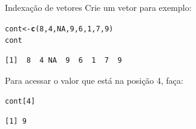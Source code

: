 \documentclass[10pt,handout]{beamer}\usepackage[]{graphicx}\usepackage[]{color}
\makeatletter
\newcommand{\hlnum}[1]{\textcolor[rgb]{0.686,0.059,0.569}{#1}}%
\newcommand{\hlstd}[1]{\textcolor[rgb]{0.345,0.345,0.345}{#1}}%
\newcommand{\hlkwb}[1]{\textcolor[rgb]{0.69,0.353,0.396}{#1}}%
\newcommand{\hlkwd}[1]{\textcolor[rgb]{0.737,0.353,0.396}{\textbf{#1}}}%
\newenvironment{kframe}{%
 \def\at@end@of@kframe{}%
 \ifinner\ifhmode%
  \def\at@end@of@kframe{\end{minipage}}%
  \begin{minipage}{\columnwidth}%
 \fi\fi%
 \def\FrameCommand##1{\hskip\@totalleftmargin \hskip-\fboxsep
 \colorbox{shadecolor}{##1}\hskip-\fboxsep
     \hskip-\linewidth \hskip-\@totalleftmargin \hskip\columnwidth}%
 \MakeFramed {\advance\hsize-\width
   \@totalleftmargin\z@ \linewidth\hsize
   \@setminipage}}%
 {\par\unskip\endMakeFramed%
 \at@end@of@kframe}
\newenvironment{knitrout}{}{} %
\makeatother
\begin{document}
\begin{frame}[fragile]{Indexação de vetores}
Crie um vetor para exemplo:
\begin{knitrout}\small
{}\color{fgcolor}\begin{kframe}
\begin{alltt}
\hlstd{cont} \hlkwb{<-} \hlkwd{c}\hlstd{(}\hlnum{8}\hlstd{,} \hlnum{4}\hlstd{,} \hlnum{NA}\hlstd{,} \hlnum{9}\hlstd{,} \hlnum{6}\hlstd{,} \hlnum{1}\hlstd{,} \hlnum{7}\hlstd{,} \hlnum{9}\hlstd{)}
\hlstd{cont}
\end{alltt}
\begin{verbatim}
[1]  8  4 NA  9  6  1  7  9
\end{verbatim}
\end{kframe}
\end{knitrout}
Para acessar o valor que está na posição 4, faça:
\begin{knitrout}\small
{}\color{fgcolor}\begin{kframe}
\begin{alltt}
\hlstd{cont[}\hlnum{4}\hlstd{]}
\end{alltt}
\begin{verbatim}
[1] 9
\end{verbatim}
\end{kframe}
\end{knitrout}
\begin{center}
\end{center}
\end{frame}
\end{document}
